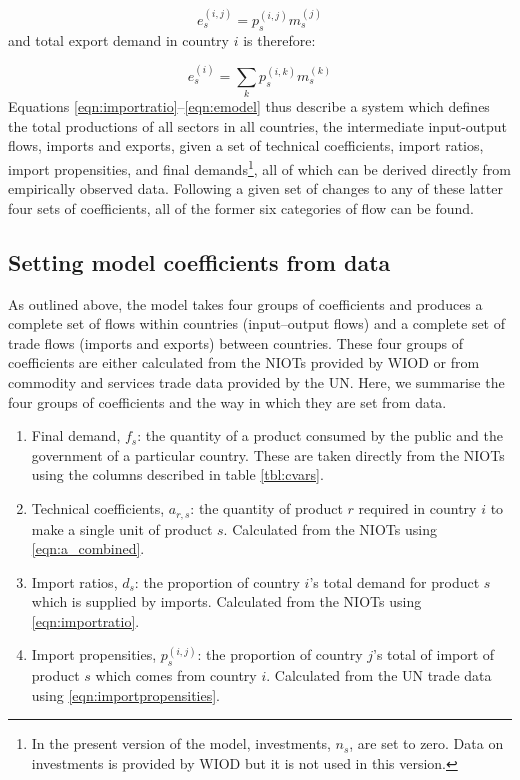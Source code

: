 \documentclass[a4paper]{article}
\begin{document}
\begin{equation*}
e_s^{(i,j)} = p_s^{(i,j)}m_s^{(j)}
\end{equation*}
and total export demand in country $i$ is therefore:

\begin{equation}\label{eqn:emodel}
e_s^{(i)} = \sum_k{p_s^{(i,k)}m_s^{(k)}}
\end{equation}
Equations \eqref{eqn:importratio}--\eqref{eqn:emodel} thus describe a system which defines the total productions of all sectors in all countries, the intermediate input-output flows, imports and exports, given a set of technical coefficients, import ratios, import propensities, and final demands\footnote{In the present version of the model, investments, $n_s$, are set to zero. 
Data on investments is provided by WIOD but it is not used in this version.}, all of which can be derived directly from empirically observed data.
Following a given set of changes to any of these latter four sets of coefficients, all of the former six categories of flow can be found.

\subsection{Setting model coefficients from data}
As outlined above, the model takes four groups of coefficients and produces a complete set of flows within countries (input--output flows) and a complete set of trade flows (imports and exports) between countries.
These four groups of coefficients are either calculated from the NIOTs provided by WIOD or from commodity and services trade data provided by the UN.
Here, we summarise the four groups of coefficients and the way in which they are set from data.
\begin{enumerate}
\item Final demand, $f_s$: the quantity of a product consumed by the public and the government of a particular country. These are taken directly from the NIOTs using the columns described in table \ref{tbl:cvars}.
\item Technical coefficients, $a_{r,s}$: the quantity of product $r$ required in country $i$ to make a single unit of product $s$. Calculated from the NIOTs using \cref{eqn:a_combined}. 
\item Import ratios, $d_s$: the proportion of country $i$'s total demand for product $s$ which is supplied by imports. Calculated from the NIOTs using \cref{eqn:importratio}.
\item Import propensities, $p_s^{(i,j)}$: the proportion of country $j$'s total of import of product $s$ which comes from country $i$. Calculated from the UN trade data using \cref{eqn:importpropensities}.
\end{enumerate}
\end{document}

